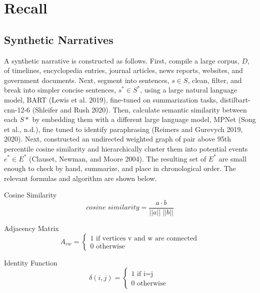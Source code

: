 \documentclass{article}
\begin{document}
\hypertarget{recall}{%
\section{Recall}\label{recall}}

\hypertarget{synthetic-narratives}{%
\subsection{Synthetic Narratives}\label{synthetic-narratives}}

\doublespacing

A synthetic narrative is constructed as follows. First, compile a large
corpus, \(D\), of timelines, encyclopedia entries, journal articles,
news reports, websites, and government documents. Next, segment into
sentences, \(s \in S\), clean, filter, and break into simpler concise
sentences, \(s^* \in S^*\), using a large natural language model, BART
(Lewis et al. 2019), fine-tuned on summarization tasks,
distilbart-cnn-12-6 (Shleifer and Rush 2020). Then, calculate semantic
similarity between each \(S*\) by embedding them with a different large
language model, MPNet (Song et al., n.d.), fine tuned to identify
paraphrasing (Reimers and Gurevych 2019, 2020). Next, constructed an
undirected weighted graph of pair above 95th percentile cosine
similarity and hierarchically cluster them into potential events
\(e^* \in E^*\) (Clauset, Newman, and Moore 2004). The resulting set of
\(E^*\) are small enough to check by hand, summarize, and place in
chronological order. The relevant formulas and algorithm are shown
below.

\singlespacing

Cosine Similarity \begin{equation}
cosine\;similarity = \frac{a \cdot b}{ || a  ||\;|| b  || }
\end{equation}

Adjacency Matrix \begin{equation} \label{eq:sclrec2}
A_{vw}= \begin{cases} 1 \text{ if vertices v and w are connected} \\ 0 \text{ otherwise } \end{cases}
\end{equation}

Identity Function \begin{equation}
\delta(i,j)= \begin{cases} 1 \text{ if i=j} \\ 0 \text{ otherwise } \end{cases}
\end{equation}
\end{document}
